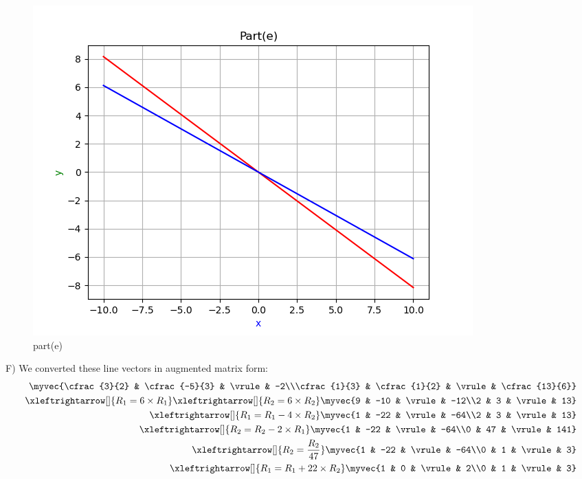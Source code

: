 \begin{enumerate}[label=\thesection.\arabic*.,ref=\thesection.\theenumi]
\renewcommand{\thefigure}{\theenumi.\arabic{figure}}
\begin{figure}[!ht]
    \centering
    \includegraphics[width=\columnwidth]{./figures/A1_parte}
\caption{part(e)}
\label{fig: part(e)}
\end{figure}

F)
We converted these line vectors in augmented matrix form:\\ 

\begin{align*}
    \myvec{\cfrac{3}{2} & \cfrac{-5}{3} & \vrule & -2\\\cfrac{1}{3} & \cfrac{1}{2} & \vrule & \cfrac{13}{6}}
\\
    \xleftrightarrow[]{R_{1}=6\times R_{1}}
    \xleftrightarrow[]{R_{2}=6\times R_{2}} \myvec{9 & -10 & \vrule & -12\\2 & 3 & \vrule & 13}
\\
    \xleftrightarrow[]{R_{1}=R_{1}-4\times R_{2}} \myvec{1 & -22 & \vrule & -64\\2 & 3 & \vrule & 13}
\\
    \xleftrightarrow[]{R_{2}=R_{2}-2\times R_{1}}  \myvec{1 & -22 & \vrule & -64\\0 & 47 & \vrule & 141}
\\
    \xleftrightarrow[]{R_{2}=\frac{R_{2}}{47}}  \myvec{1 & -22 & \vrule & -64\\0 & 1 & \vrule & 3}
\\
    \xleftrightarrow[]{R_{1}=R_{1}+22\times R_{2}} \myvec{1 & 0 & \vrule & 2\\0 & 1 & \vrule & 3}
\end{align*}


\end{enumerate}
